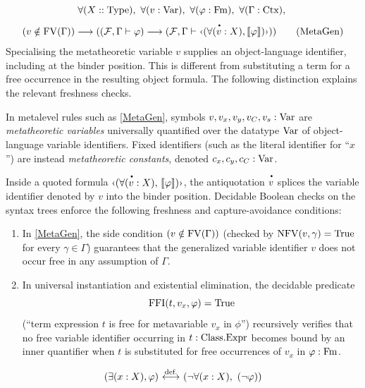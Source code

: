 \begin{definition}
\[
\forall (X::\Type),\ %
\forall (v:\Var),\ %
\forall (\phi:\Fm),\ %
\forall (\Gamma : \Ctx),\ %
\]\[
(v\notin\FV(\Gamma))
\implies
(
(\Fau,\Gamma\vdash \phi)
\implies
(\Fau,\Gamma\vdash
\mquote{
(\forall (
\antiquote{
v
}
:X),
\mantiquote{
\phi
}
)
}
)
)
\clabeltag{MetaGen}
\]
Specialising the metatheoretic variable $v$ supplies an object-language
identifier, including at the binder position. This is different from
substituting a term for a free occurrence in the resulting object formula.
The following distinction explains the relevant freshness checks.
\begin{remark}
In metalevel rules such as \eqref{MetaGen}, symbols $v, v_x, v_y, v_C, v_s : \mathrm{Var}$ are \emph{metatheoretic variables} universally quantified over the datatype $\mathrm{Var}$ of object-language variable identifiers. Fixed identifiers (such as the literal identifier for ``$x$'') are instead \emph{metatheoretic constants}, denoted $c_x, c_y, c_C : \mathrm{Var}$.

Inside a quoted formula $\mquote{(\forall (\antiquote{v}:X),\,\mantiquote{\phi})}$, the antiquotation $\antiquote{v}$ splices the variable identifier denoted by $v$ into the binder position. Decidable Boolean checks on the syntax trees enforce the following freshness and capture-avoidance conditions:
\begin{enumerate}
\item In \eqref{MetaGen}, the side condition $(v \notin \mathrm{FV}(\Gamma))$ (checked by $\mathrm{NFV}(v, \gamma) = {\textrm{True}}$ for every $\gamma \in \Gamma$) guarantees that the generalized variable identifier $v$ does not occur free in any assumption of $\Gamma$.
\item In universal instantiation and existential elimination, the decidable predicate
\[
\mathrm{FFI}(t, v_x, \varphi) = {\textrm{True}}
\]
(``term expression $t$ is free for metavariable $v_x$ in $\phi$'') recursively verifies that no free variable identifier occurring in $t : {\text{Class}}.\mathrm{Expr}$ becomes bound by an inner quantifier when $t$ is substituted for free occurrences of $v_x$ in $\varphi : \mathrm{Fm}$.
\end{enumerate}
\end{remark}
\end{definition}

\begin{definition}
\[
(\exists (x:X), \varphi) \ {\stackrel{{\textrm{def.}}}{\longleftrightarrow}}\  (\neg \forall (x:X),\ (\neg\varphi))
\]
\end{definition}



